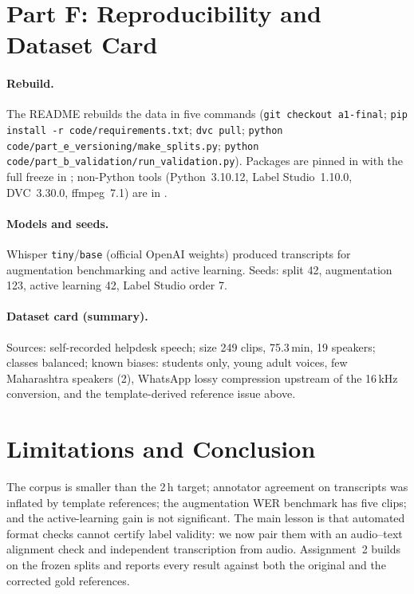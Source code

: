 \documentclass[sigconf,authordraft]{acmart}
\begin{document}
\section{Part F: Reproducibility and Dataset Card}\label{sec:repro}
\paragraph{Rebuild.} The README rebuilds the data in five commands (\texttt{git checkout a1-final}; \texttt{pip install -r code/requirements.txt}; \texttt{dvc pull}; \texttt{python code/part\_e\_versioning/make\_splits.py}; \texttt{python code/part\_b\_validation/run\_validation.py}). Packages are pinned in  with the full freeze in ; non-Python tools (Python~3.10.12, Label Studio~1.10.0, DVC~3.30.0, ffmpeg~7.1) are in .
\paragraph{Models and seeds.} Whisper \texttt{tiny}/\texttt{base} (official OpenAI weights) produced transcripts for augmentation benchmarking and active learning. Seeds: split 42, augmentation 123, active learning 42, Label Studio order 7.
\paragraph{Dataset card (summary).} Sources: self-recorded helpdesk speech; size 249 clips, 75.3\,min, 19 speakers; classes balanced; known biases: students only, young adult voices, few Maharashtra speakers (2), WhatsApp lossy compression upstream of the 16\,kHz conversion, and the template-derived reference issue above.

\section{Limitations and Conclusion}\label{sec:concl}
The corpus is smaller than the 2\,h target; annotator agreement on transcripts was inflated by template references; the augmentation WER benchmark has five clips; and the active-learning gain is not significant. The main lesson is that automated format checks cannot certify label validity: we now pair them with an audio--text alignment check and independent transcription from audio.
Assignment~2 builds on the frozen splits and reports every result against both the original and the corrected gold references.
\end{document}
